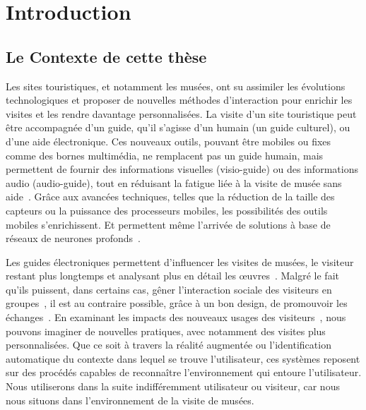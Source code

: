 \chapter{Introduction}

%
%
%
\section{Le Contexte de cette thèse}

Les sites touristiques, et notamment les musées, ont su assimiler les évolutions technologiques et proposer de nouvelles méthodes d'interaction pour enrichir les visites et les rendre davantage personnalisées.
La visite d'un site touristique peut être accompagnée d'un guide, qu'il s'agisse d'un humain (un guide culturel), ou d'une aide électronique.
Ces nouveaux outils, pouvant être mobiles ou fixes comme des bornes multimédia, ne remplacent pas un guide humain, mais permettent de fournir des informations visuelles (visio-guide) ou des informations audio (audio-guide), tout en réduisant la fatigue liée à la visite de musée sans aide~\cite{bitgood2009museum}.
Grâce aux avancées techniques, telles que la réduction de la taille des capteurs ou la puissance des processeurs mobiles, les possibilités des outils mobiles s'enrichissent. Et permettent même l'arrivée de solutions à base de réseaux de neurones profonds~\cite{howard2017mobilenets}.

Les guides électroniques permettent d'influencer les visites de musées, le visiteur restant plus longtemps et analysant plus en détail les œuvres~\cite{lanir2013influence}.
Malgré le fait qu'ils puissent, dans certains cas, gêner l'interaction sociale des visiteurs en groupes~\cite{lanir2013influence, grinter2002revisiting}, il est au contraire possible, grâce à un bon design, de promouvoir les échanges~\cite{gammon2008designing}.
En examinant les impacts des nouveaux usages des visiteurs~\cite{andreacola2014musee}, nous pouvons imaginer de nouvelles pratiques, avec notamment des visites plus personnalisées.
Que ce soit à travers la réalité augmentée ou l'identification automatique du contexte dans lequel se trouve l'utilisateur, ces systèmes reposent sur des procédés capables de reconnaître l'environnement qui entoure l'utilisateur.
Nous utiliserons dans la suite indifféremment utilisateur ou visiteur, car nous nous situons dans l'environnement de la visite de musées.

